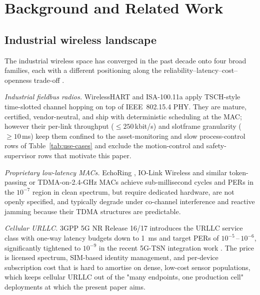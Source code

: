 \documentclass[journal,onecolumn,11pt,a4paper]{IEEEtran}
\begin{document}
\section{Background and Related Work}
\label{sec:related}

\subsection{Industrial wireless landscape}
\label{sec:related-landscape}

The industrial wireless space has converged in the past decade onto
four broad families, each with a different positioning along the
reliability--latency--cost--openness trade-off
\cite{Wol17,Cav19,Fan22}.

\emph{Industrial fieldbus radios.}
WirelessHART \cite{IEC62591} and ISA-100.11a \cite{IEC62734} apply
TSCH-style time-slotted channel hopping on top of IEEE~802.15.4
PHY. They are mature, certified, vendor-neutral, and ship with
deterministic scheduling at the MAC; however their per-link
throughput ($\le 250$\,kbit/s) and slotframe granularity
($\ge 10$\,ms) keep them confined to the asset-monitoring and
slow process-control rows of Table~\ref{tab:use-cases} and exclude
the motion-control and safety-supervisor rows that motivate this
paper.

\emph{Proprietary low-latency MACs.}
EchoRing \cite{Doe18}, IO-Link Wireless \cite{IOLinkW} and similar
token-passing or TDMA-on-2.4-GHz MACs achieve sub-millisecond
cycles and PERs in the $10^{-7}$ region in clean spectrum, but
require dedicated hardware, are not openly specified, and
typically degrade under co-channel interference and reactive
jamming because their TDMA structures are predictable.

\emph{Cellular URLLC.}
3GPP 5G NR Release 16/17 \cite{TS22104,Pop20} introduces
the URLLC service class with one-way latency budgets down to
\SI{1}{ms} and target PERs of $10^{-5}\,$--$\,10^{-6}$,
significantly tightened to $10^{-9}$ in the recent 5G-TSN
integration work \cite{TSN5G25}. The price is licensed spectrum,
SIM-based identity management, and per-device subscription cost
that is hard to amortise on dense, low-cost sensor populations,
which keeps cellular URLLC out of the "many endpoints, one
production cell" deployments at which the present paper aims.
\end{document}
